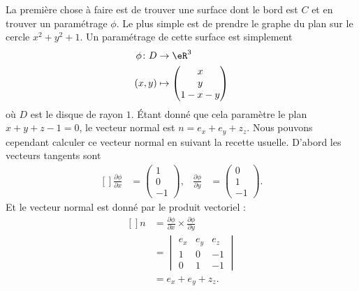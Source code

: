 \begin{example}
	La première chose à faire est de trouver une surface dont le bord est $C$ et en trouver un paramétrage $\phi$. Le plus simple est de prendre le graphe du plan sur le cercle $x^2+y^2+1$. Un paramétrage de cette surface est simplement
	\begin{equation}
		\begin{aligned}
			\phi\colon D & \to \eR^3                          \\
			(x,y)        & \mapsto \begin{pmatrix}
				x \\
				y \\
				1-x-y
			\end{pmatrix}
		\end{aligned}
	\end{equation}
	où $D$ est le disque de rayon $1$. Étant donné que cela paramètre le plan $x+y+z-1=0$, le vecteur normal est $n=e_x+e_y+z_z$. Nous pouvons cependant calculer ce vecteur normal en suivant la recette usuelle. D'abord les vecteurs tangents sont
	\begin{equation}
		\begin{aligned}[]
			\frac{ \partial \phi }{ \partial x } & =\begin{pmatrix}
				1 \\
				0 \\
				-1
			\end{pmatrix},
			                                     & \frac{ \partial \phi }{ \partial y } & =\begin{pmatrix}
				0 \\
				1 \\
				-1
			\end{pmatrix}.
		\end{aligned}
	\end{equation}
	Et le vecteur normal est donné par le produit vectoriel :
	\begin{equation}
		\begin{aligned}[]
			n & =\frac{ \partial \phi }{ \partial x }\times\frac{ \partial \phi }{ \partial y } \\
			  & =\begin{vmatrix}
				e_x & e_y & e_z \\
				1   & 0   & -1  \\
				0   & 1   & -1
			\end{vmatrix}                                                     \\
			  & =e_x+e_y+z_z.
		\end{aligned}
	\end{equation}


\end{example}
